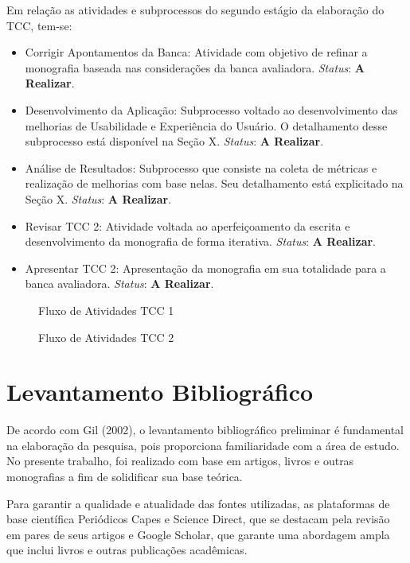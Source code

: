 Em relação as atividades e subprocessos do segundo estágio da elaboração do TCC, tem-se:

\begin{itemize}
	\item Corrigir Apontamentos da Banca: Atividade com objetivo de refinar a monografia baseada nas considerações da banca avaliadora. \textit{Status}: \textbf{A Realizar}.
	\item Desenvolvimento da Aplicação: Subprocesso voltado ao desenvolvimento das melhorias de Usabilidade e Experiência do Usuário. O detalhamento desse subprocesso está disponível na Seção X. \textit{Status}: \textbf{A Realizar}.
	\item Análise de Resultados: Subprocesso que consiste na coleta de métricas e realização de melhorias com base nelas. Seu detalhamento está explicitado na Seção X. \textit{Status}: \textbf{A Realizar}.
	\item Revisar TCC 2: Atividade voltada ao aperfeiçoamento da escrita e desenvolvimento da monografia de forma iterativa. \textit{Status}: \textbf{A Realizar}.
	\item Apresentar TCC 2: Apresentação da monografia em sua totalidade para a banca avaliadora. \textit{Status}: \textbf{A Realizar}.
\end{itemize}

\begin{figure}[h!]
	\centering
	\caption{Fluxo de Atividades TCC 1}
	\label{fig04}
\end{figure}

\begin{figure}[h!]
	\centering
	\caption{Fluxo de Atividades TCC 2}
	\label{fig05}
\end{figure}

\section{Levantamento Bibliográfico}
\label{sec:Levantamento Bibliografico}
De acordo com Gil (2002), o levantamento bibliográfico preliminar é fundamental na elaboração da pesquisa, pois proporciona familiaridade com a área de estudo. No presente trabalho, foi realizado com base em artigos, livros e outras monografias a fim de solidificar sua base teórica.

Para garantir a qualidade e atualidade das fontes utilizadas, as plataformas de base científica Periódicos Capes e Science Direct, que se destacam pela revisão em pares de seus artigos e Google Scholar, que garante uma abordagem ampla que inclui livros e outras publicações acadêmicas. 

